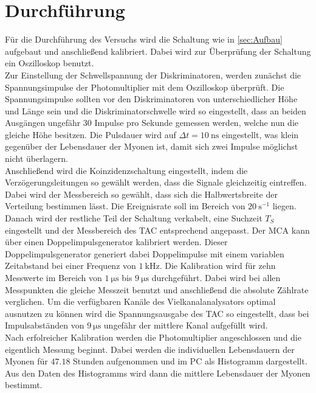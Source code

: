 \section{Durchführung}
\label{sec:Durchführung}
Für die Durchführung des Versuchs wird die Schaltung wie in \autoref{sec:Aufbau} aufgebaut und anschließend kalibriert.
Dabei wird zur Überprüfung der Schaltung ein Oszilloskop benutzt.\\
Zur Einstellung der Schwellspannung der Diskriminatoren, werden zunächst die Spannungsimpulse der Photomultiplier mit dem Oszilloskop überprüft.
Die Spannungsimpulse sollten vor den Diskriminatoren von unterschiedlicher Höhe und Länge sein und die Diskriminatorschwelle wird so eingestellt,
dass an beiden Ausgängen ungefähr $30$ Impulse pro Sekunde gemessen werden, welche nun die gleiche Höhe besitzen.
Die Pulsdauer wird auf $\Delta t = \qty{10}{\nano\second}$ eingestellt, was klein gegenüber der Lebensdauer der Myonen ist, damit sich zwei Impulse
möglichst nicht überlagern.\\
Anschließend wird die Koinzidenzschaltung eingestellt, indem die Verzögerungsleitungen so gewählt werden, dass die Signale gleichzeitig eintreffen. Dabei wird der Messbereich so gewählt,
dass sich die Halbwertsbreite der Verteilung bestimmen lässt. Die Ereignisrate soll im Bereich von $\qty{20}{\second^{-1}}$ liegen.\\
Danach wird der restliche Teil der Schaltung verkabelt, eine Suchzeit $T_S$ eingestellt und der Messbereich des TAC entsprechend angepasst.
Der MCA kann über einen Doppelimpulsgenerator kalibriert werden. Dieser Doppelimpulsgenerator generiert dabei Doppelimpulse mit einem
variablen Zeitabstand bei einer Frequenz von $\qty{1}{\kilo\Hz}$. Die Kalibration wird für zehn Messwerte im Bereich von
$\qty{1}{\micro\second}$ bis $\qty{9}{\micro\second}$ durchgeführt. Dabei wird bei allen Messpunkten die gleiche Messzeit benutzt
und anschließend die absolute Zählrate verglichen.
Um die verfügbaren Kanäle des Vielkanalanalysators optimal ausnutzen zu können wird die Spannungsausgabe des
TAC so eingestellt, dass bei Impulsabständen von $\qty{9}{\micro\second}$ ungefähr der mittlere Kanal
aufgefüllt wird.\\
Nach erfolreicher Kalibration werden die Photomultiplier angeschlossen und die eigentlich Messung beginnt.
Dabei werden die individuellen Lebensdauern der Myonen für $47.18$ Stunden aufgenommen und im PC als Histogramm dargestellt.
Aus den Daten des Histogramms wird dann die mittlere Lebensdauer der Myonen bestimmt.


